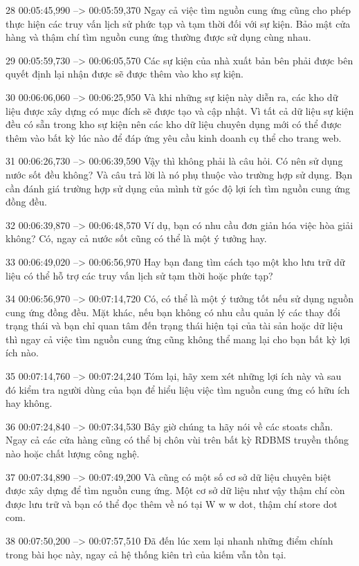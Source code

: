 28
00:05:45,990 --> 00:05:59,370
Ngay cả việc tìm nguồn cung ứng cũng cho phép thực hiện các truy vấn lịch sử phức tạp và tạm thời đối với sự kiện.  Bảo mật cửa hàng và thậm chí tìm nguồn cung ứng thường được sử dụng cùng nhau.

29
00:05:59,730 --> 00:06:05,570
Các sự kiện của nhà xuất bản bên phải được bên quyết định lại nhận được sẽ được thêm vào kho sự kiện.

30
00:06:06,060 --> 00:06:25,950
Và khi những sự kiện này diễn ra, các kho dữ liệu được xây dựng có mục đích sẽ được tạo và cập nhật.  Vì tất cả dữ liệu sự kiện đều có sẵn trong kho sự kiện nên các kho dữ liệu chuyên dụng mới có thể được thêm vào bất kỳ lúc nào để đáp ứng yêu cầu kinh doanh cụ thể cho trang web.

31
00:06:26,730 --> 00:06:39,590
Vậy thì không phải là câu hỏi.  Có nên sử dụng nước sốt đều không?  Và câu trả lời là nó phụ thuộc vào trường hợp sử dụng.  Bạn cần đánh giá trường hợp sử dụng của mình từ góc độ lợi ích tìm nguồn cung ứng đồng đều.

32
00:06:39,870 --> 00:06:48,570
Ví dụ, bạn có nhu cầu đơn giản hóa việc hòa giải không?  Có, ngay cả nước sốt cũng có thể là một ý tưởng hay.

33
00:06:49,020 --> 00:06:56,970
Hay bạn đang tìm cách tạo một kho lưu trữ dữ liệu có thể hỗ trợ các truy vấn lịch sử tạm thời hoặc phức tạp?

34
00:06:56,970 --> 00:07:14,720
Có, có thể là một ý tưởng tốt nếu sử dụng nguồn cung ứng đồng đều.  Mặt khác, nếu bạn không có nhu cầu quản lý các thay đổi trạng thái và bạn chỉ quan tâm đến trạng thái hiện tại của tài sản hoặc dữ liệu thì ngay cả việc tìm nguồn cung ứng cũng không thể mang lại cho bạn bất kỳ lợi ích nào.

35
00:07:14,760 --> 00:07:24,240
Tóm lại, hãy xem xét những lợi ích này và sau đó kiểm tra người dùng của bạn để hiểu liệu việc tìm nguồn cung ứng có hữu ích hay không.

36
00:07:24,840 --> 00:07:34,530
Bây giờ chúng ta hãy nói về các stoats chẵn.  Ngay cả các cửa hàng cũng có thể bị chôn vùi trên bất kỳ RDBMS truyền thống nào hoặc chất lượng công nghệ.

37
00:07:34,890 --> 00:07:49,200
Và cũng có một số cơ sở dữ liệu chuyên biệt được xây dựng để tìm nguồn cung ứng.  Một cơ sở dữ liệu như vậy thậm chí còn được lưu trữ và bạn có thể đọc thêm về nó tại W w w dot, thậm chí store dot com.

38
00:07:50,200 --> 00:07:57,510
Đã đến lúc xem lại nhanh những điểm chính trong bài học này, ngay cả hệ thống kiên trì của kiếm vẫn tồn tại.

